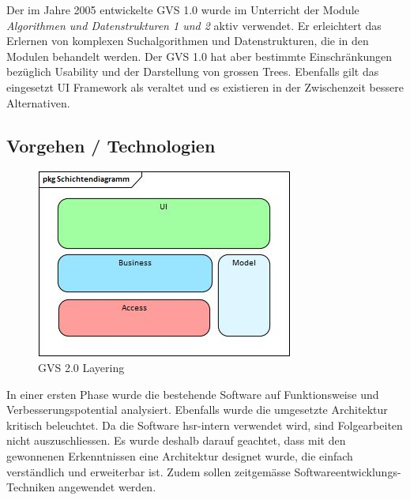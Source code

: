 \documentclass[11pt,a4paper,english,oneside]{book}
\numberwithin{equation}{chapter}
\begin{document}
	\noindent
	Der im Jahre 2005 entwickelte GVS 1.0 wurde im Unterricht der Module \textit{Algorithmen und Datenstrukturen 1 und 2} aktiv verwendet. Er erleichtert das Erlernen von komplexen Suchalgorithmen und Datenstrukturen, die in den Modulen behandelt werden. Der GVS 1.0 hat aber bestimmte Einschränkungen bezüglich Usability und der Darstellung von grossen Trees. Ebenfalls gilt das eingesetzt UI Framework als veraltet und es existieren in der Zwischenzeit bessere Alternativen.
	
	\subsection*{Vorgehen / Technologien}	
	\begin{figure}
		\vspace{-28pt}
		\begin{center}
			\includegraphics[width=\linewidth]{assets/images/layering}
		\end{center}
		\caption{GVS 2.0 Layering}
		\vspace{-20pt}
	\end{figure}
	
	In einer ersten Phase wurde die bestehende Software auf Funktionsweise und Verbesserungspotential analysiert. Ebenfalls wurde die umgesetzte Architektur kritisch beleuchtet. Da die Software \gls{hsr}-intern verwendet wird, sind Folgearbeiten nicht auszuschliessen. Es wurde deshalb darauf geachtet, dass mit den gewonnenen Erkenntnissen eine Architektur designet wurde, die einfach verständlich und erweiterbar ist. Zudem sollen zeitgemässe Softwareentwicklungs-Techniken angewendet werden. \\
	
\end{document}
